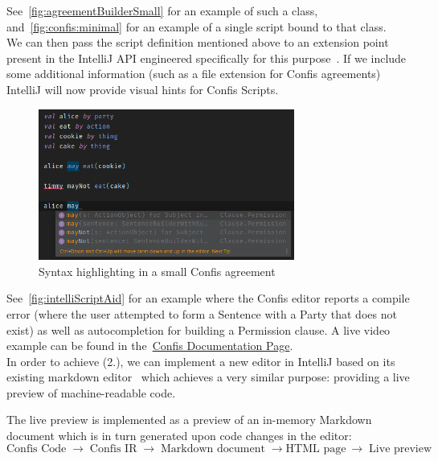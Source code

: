 See~\autoref{fig:agreementBuilderSmall} for an example of such a class, and~\autoref{fig:confis:minimal} for an example of a single script bound to that class.\\

We can then pass the script definition mentioned above to an extension point present in the IntelliJ API engineered specifically for this purpose~\cite{ideaExtensionPoints, intelliJRepo}.
If we include some additional information (such as a file extension for Confis agreements) IntelliJ will now provide visual hints for Confis Scripts.

\begin{figure}[h]
    \centering
    \includegraphics[width=0.75\textwidth]{figures/minimal.editor.highlighting.confis}
    \caption{Syntax highlighting in a small Confis agreement}
    \label{fig:intelliScriptAid}
\end{figure}

See~\autoref{fig:intelliScriptAid} for an example where the Confis editor reports a compile error (where the user attempted to form a Sentence with a Party that does not exist) as well as autocompletion for building a Permission clause.
A live video example can be found in the~\href{https://confis.dcotta.eu/0.1.1/IDE%20Support/IDEAPlugin/}{Confis Documentation Page}.\\

In order to achieve (2.), we can implement a new editor in IntelliJ based on its existing markdown editor~\cite{ideaMarkdownPreview} which achieves a very similar purpose: providing a live preview of machine-readable code.

The live preview is implemented as a preview of an in-memory Markdown document which is in turn generated upon code changes in the editor:
\begin{equation*}
    \text{Confis Code}\; \to\; \text{Confis IR}\; \to\; \text{Markdown document}\; \to \text{HTML page}\ \to\; \text{Live preview}
\end{equation*}

